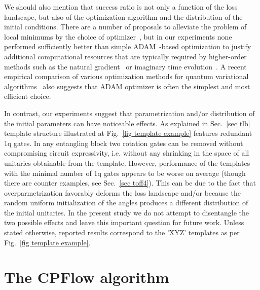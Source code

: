 \documentclass[twocolumn, amsfonts, amssymb, aps, nofootinbib]{revtex4-2}
\begin{document}
We should also mention that success ratio is not only a function of the loss landscape, but also of the optimization algorithm and the distribution of the initial conditions. There are a number of proposals to alleviate the problem of local minimums by the choice of optimizer~\cite{Wierichs2020, Rivera-Dean2021}, but in our experiments none performed sufficiently better than simple ADAM~\cite{Kingma2015}-based optimization to justify additional computational resources that are typically required by higher-order methods such as the natural gradient~\cite{Stokes2020} or imaginary time evolution~\cite{Jones2018a}. A recent empirical comparison of various optimization methods for quantum variational algorithms~\cite{Lockwood2022} also suggests that ADAM optimizer is often the simplest and most efficient choice.

In contrast, our experiments suggest that parametrization and/or distribution of the initial parameters can have noticeable effects. As explained in Sec.~\ref{sec tlb} template structure illustrated at Fig.~\ref{fig template example} features redundant 1q gates. In any entangling block two rotation gates can be removed without compromising circuit expressivity, i.e. without any shrinking in the space of all unitaries obtainable from the template. However, performance of the templates with the minimal number of 1q gates appears to be worse on average (though there are counter examples, see Sec.~\ref{sec toff4}). This can be due to the fact that overparmetrization favorably deforms the loss landscape and/or because the random uniform initialization of the angles produces a different distribution of the initial unitaries. In the present study we do not attempt to disentangle the two possible effects and leave this important question for future work. Unless stated otherwise, reported results correspond to the 'XYZ' templates as per Fig.~\ref{fig template example}.


\section{The CPFlow algorithm \label{sec cpflow}}
\end{document}
